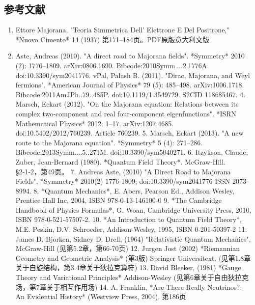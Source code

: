 \subsection{参考文献} 
\begin{enumerate}
\item Ettore Majorana, "Teoria Simmetrica Dell' Elettrone E Del Positrone," *Nuovo Cimento* 14 (1937) 第171–184页。PDF原版意大利文版  
\item Aste, Andreas (2010). "A direct road to Majorana fields". *Symmetry* 2010 (2): 1776–1809. arXiv:0806.1690. Bibcode:2010Symm....2.1776A. doi:10.3390/sym2041776.  
vPal, Palash B. (2011). "Dirac, Majorana, and Weyl fermions". *American Journal of Physics* 79 (5): 485–498. arXiv:1006.1718. Bibcode:2011AmJPh..79..485P. doi:10.1119/1.3549729. S2CID 118685467.  
4. Marsch, Eckart (2012). "On the Majorana equation: Relations between its complex two-component and real four-component eigenfunctions". *ISRN Mathematical Physics* 2012: 1–17. arXiv:1207.4685. doi:10.5402/2012/760239. Article 760239.  
5. Marsch, Eckart (2013). "A new route to the Majorana equation". *Symmetry* 5 (4): 271–286. Bibcode:2013Symm....5..271M. doi:10.3390/sym5040271.  
6. Itzykson, Claude; Zuber, Jean-Bernard (1980). *Quantum Field Theory*. McGraw-Hill. §2‑1‑2，第49页。  
7. Andreas Aste, (2010) "A Direct Road to Majorana Fields", *Symmetry* 2010(2) 1776-1809; doi:10.3390/sym2041776 ISSN 2073-8994.  
8. *Quantum Mechanics*, E. Abers, Pearson Ed., Addison Wesley, Prentice Hall Inc, 2004, ISBN 978-0-13-146100-0  
9. *The Cambridge Handbook of Physics Formulas*, G. Woan, Cambridge University Press, 2010, ISBN 978-0-521-57507-2.  
10. *An Introduction to Quantum Field Theory*, M.E. Peskin, D.V. Schroeder, Addison-Wesley, 1995, ISBN 0-201-50397-2  
11. James D. Bjorken, Sidney D. Drell, (1964) "Relativistic Quantum Mechanics", McGraw-Hill (见第5.2章，第66-70页)  
12. Jurgen Jost (2002) *Riemannian Geometry and Geometric Analysis* (第3版) Springer Universitext. (见第1.8章关于自旋结构，第3.4章关于狄拉克算符)  
13. David Bleeker, (1981) *Gauge Theory and Variational Principles* Addison-Wesley (见第6章关于自由狄拉克场，第7章关于相互作用场)  
14. A. Franklin, *Are There Really Neutrinos?: An Evidential History* (Westview Press, 2004), 第186页
\end{enumerate}
